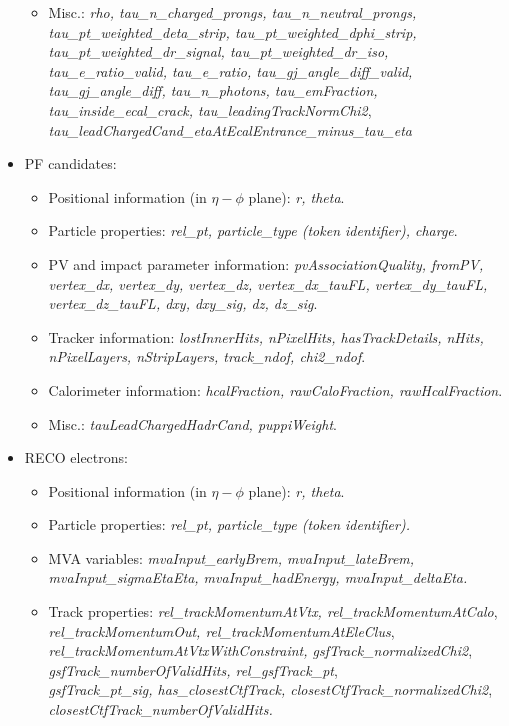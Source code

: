 \begin{itemize}
\begin{itemize}
		\item Misc.: \textit{rho, tau\_n\_charged\_prongs, tau\_n\_neutral\_prongs, 
		 tau\_pt\_weighted\_deta\_strip, tau\_pt\_weighted\_dphi\_strip, tau\_pt\_weighted\_dr\_signal, tau\_pt\_weighted\_dr\_iso, tau\_e\_ratio\_valid, tau\_e\_ratio, tau\_gj\_angle\_diff\_valid, tau\_gj\_angle\_diff, tau\_n\_photons, tau\_emFraction, tau\_inside\_ecal\_crack, tau\_leadingTrackNormChi2},\\ \textit{tau\_leadChargedCand\_etaAtEcalEntrance\_minus\_tau\_eta}
	\end{itemize}
	\item PF candidates:
	\begin{itemize}
		\item Positional information (in $\eta-\phi$ plane): \textit{r, theta}.
		\item Particle properties: \textit{rel\_pt, particle\_type (token identifier), charge}.
		\item PV and impact parameter information: \textit{pvAssociationQuality, fromPV, vertex\_dx, vertex\_dy, vertex\_dz, vertex\_dx\_tauFL, vertex\_dy\_tauFL, vertex\_dz\_tauFL,  dxy, dxy\_sig, dz, dz\_sig}. 
		\item Tracker information:  \textit{lostInnerHits, nPixelHits, hasTrackDetails, nHits, nPixelLayers, nStripLayers, track\_ndof, chi2\_ndof}.
		\item  Calorimeter information: \textit{hcalFraction, rawCaloFraction, rawHcalFraction}. 
		\item Misc.: \textit{tauLeadChargedHadrCand, puppiWeight}.
	\end{itemize}
	\item RECO electrons:
	\begin{itemize}
		\item Positional information (in $\eta-\phi$ plane): \textit{r, theta}.
		\item Particle properties: \textit{rel\_pt, particle\_type (token identifier).}
		
		\item MVA variables: \textit{mvaInput\_earlyBrem, mvaInput\_lateBrem, mvaInput\_sigmaEtaEta, mvaInput\_hadEnergy, mvaInput\_deltaEta.}
		
		\item Track properties: \textit{rel\_trackMomentumAtVtx, rel\_trackMomentumAtCalo},\\\textit{rel\_trackMomentumOut, rel\_trackMomentumAtEleClus},\\ \textit{rel\_trackMomentumAtVtxWithConstraint, gsfTrack\_normalizedChi2},\\ \textit{gsfTrack\_numberOfValidHits, rel\_gsfTrack\_pt},\\ \textit{gsfTrack\_pt\_sig, has\_closestCtfTrack, closestCtfTrack\_normalizedChi2},\\ \textit{closestCtfTrack\_numberOfValidHits.}
		

\end{itemize}
\end{itemize}
